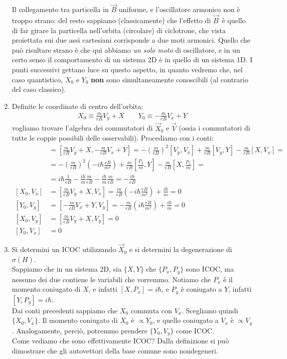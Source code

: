 \documentclass[../../FisicaTeorica.tex]{subfiles}
\begin{document}
\begin{enumerate}
Il collegamento tra particella in $\vec{B}$ uniforme, e l'oscillatore armonico non è troppo strano: del resto sappiamo (classicamente) che l'effetto di $\vec{B}$\ è quello di far girare la particella nell'orbita (circolare) di ciclotrone, che vista proiettata sui due assi cartesiani corrisponde a due moti armonici. Quello che può risultare strano è che qui abbiamo \textit{un solo moto} di oscillatore, e in un certo senso il comportamento di un sistema 2D è  in quello di un sistema 1D. I punti successivi gettano luce su questo aspetto, in quanto vedremo che, nel caso quantistico, $X_0$ e $Y_0$ \textbf{non} sono simultaneamente conoscibili (al contrario del caso classico).
\item Definite le coordinate di centro dell'orbita:
\begin{align*}
X_0 \equiv \frac{m}{eB}V_y + X\qquad Y_0 \equiv -\frac{m}{eB}V_x + Y
\end{align*}
vogliamo trovare l'algebra dei commutatori di $\vec{X}_0$ e $\vec{V}$ (ossia i commutatori di tutte le coppie possibili delle osservabili). Procediamo con i conti:
\begin{align*}
[X_0, Y_0] &= \left[\frac{m}{eB}V_y + X, -\frac{m}{eB}V_x + Y\right] = -\left(\frac{m}{eB}\right)^2 [V_y, V_x] + \frac{m}{eB}[V_y, Y] -\frac{m}{eB}[X,V_x]=\\
&=-\left(\frac{m}{eB}\right)^2 \left(-i\hbar \frac{eB}{m^2}\right) + \frac{m}{eB}\left[\frac{P_y}{m},Y\right]-\frac{m}{eB}\left[X, \frac{P_x}{m}\right]=\\
&= i\hbar \frac{1}{eB} - \frac{i\hbar}{m}\frac{m}{eB} - \frac{i\hbar}{m}\frac{m}{eB} = -\frac{i\hbar}{eB} \\
[X_0, V_x] &= \left[\frac{m}{eB}V_y + X, V_x \right] = \frac{m}{eB}\left(-i\hbar \frac{eB}{m^2}\right) + \frac{i\hbar}{m} = 0\\
[Y_0, V_y] &= \left[-\frac{m}{eB}V_x +Y, V_y\right] = -\frac{m}{eB}\left(i\hbar \frac{eB}{m^2} \right) + \frac{i\hbar}{m} = 0\\
[X_0, V_y] &= \left[\frac{m}{eB}V_y + X, V_y \right] = 0\\
[Y_0, V_x] &= 0 
\end{align*}
\item Si determini un ICOC utilizzando $\vec{X}_0$ e si determini la degenerazione di $\sigma(H)$.\\
Sappiamo che in un sistema 2D, sia $\{X, Y\}$ che $\{P_x, P_y\}$ sono ICOC, ma nessuno dei due contiene le variabili che vorremmo. Notiamo che $P_x$ è il momento coniugato di $X$, e infatti $[X,P_x]=i\hbar$, e $P_y$ è coniugato a $Y$, infatti $[Y,P_y] = i\hbar$.\\
Dai conti precedenti sappiamo che $X_0$ commuta con $V_x$. Scegliamo quindi $\{X_0, V_x\}$. Il momento coniugato di $X_0$ è $\propto Y_0$, e quello coniugato a $V_x$ è $\propto V_y$. Analogamente, perciò, potremmo prendere $\{Y_0, V_y\}$ come ICOC.\\
Come vediamo che sono effettivamente ICOC? Dalla definizione si può dimostrare che gli autovettori della base comune sono nondegeneri.\\


\end{enumerate}
\end{document}
